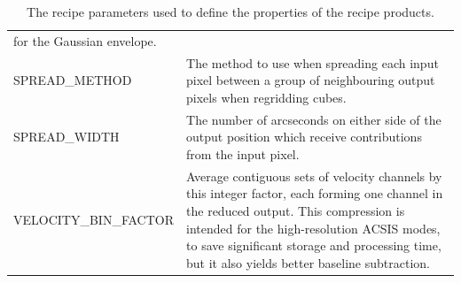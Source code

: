 \documentclass[11pt,oneside,chapters]{starlink}
\begin{document}
\begin{table}[h!]
\begin{small}
\begin{tabular}{|p{6.8cm}|p{8.6cm}|}
                         for the Gaussian envelope. \\
SPREAD\_METHOD & The method to use when spreading each input pixel between a group of
                 neighbouring output pixels when regridding cubes.\\
SPREAD\_WIDTH & The number of arcseconds on either side of the output position which
                receive contributions from the input pixel.\\
\hline
VELOCITY\_BIN\_FACTOR & Average contiguous sets of velocity channels by this integer
                        factor, each forming one channel in the reduced output.  This
                        compression is intended for the high-resolution ACSIS modes, to
                        save significant storage and processing time, but it also yields
                        better baseline subtraction. \\
\hline
\end{tabular}
\end{small}
\caption{\label{tab:makecube_params}
  The recipe parameters used to define the properties of the recipe products.}
\end{table}
\end{document}
